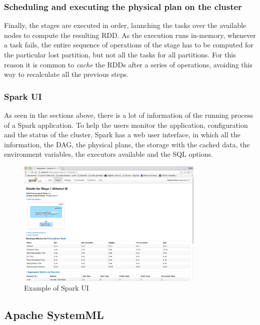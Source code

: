 \documentclass[11pt]{article} %
\begin{document}
        \subsubsection*{Scheduling and executing the physical plan on the cluster}

          Finally, the stages are executed in order, launching the tasks over the available nodes to compute the resulting RDD. As the execution runs in-memory, whenever a task fails, the entire sequence of operations of the stage has to be computed for the particular lost partition, but not all the tasks for all partitions. For this reason it is common to \emph{cache} the RDDs after a series of operations, avoiding this way to recalculate all the previous steps.

      \subsubsection{Spark UI}

        As seen in the sections above, there is a lot of information of the running process of a Spark application. To help the users monitor the application, configuration and the status of the cluster, Spark has a web user interface, in which all the information, the DAG, the physical plans, the storage with the cached data, the environment variables, the executors available and the SQL options.

        \begin{figure}[!ht]
          \centering
          \includegraphics[width=0.8\textwidth]{spark_ui.png}
          \caption{Example of Spark UI}
          \label{img:spark_ui}
        \end{figure}

\newpage

  \subsection{Apache SystemML}
\end{document}
